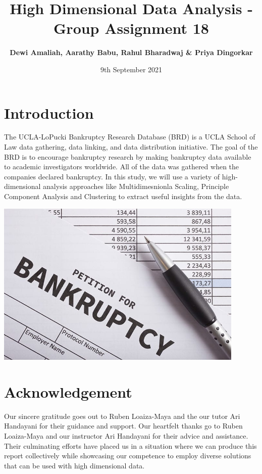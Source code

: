 \documentclass[
]{article}
\title{\textbf{High Dimensional Data Analysis - Group Assignment 18}}
\author{\textbf{Dewi Amaliah, Aarathy Babu, Rahul Bharadwaj \& Priya Dingorkar}}
\date{9th September 2021}
\begin{document}
\maketitle

{
\setcounter{tocdepth}{1}
\tableofcontents
}
\pagebreak

\hypertarget{introduction}{%
\section{Introduction}\label{introduction}}

The UCLA-LoPucki Bankruptcy Research Database (BRD) is a UCLA School of Law data gathering, data linking, and data distribution initiative. The goal of the BRD is to encourage bankruptcy research by making bankruptcy data available to academic investigators worldwide. All of the data was gathered when the companies declared bankruptcy. In this study, we will use a variety of high-dimensional analysis approaches like Multidimesnionla Scaling, Principle Component Analysis and Clustering to extract useful insights from the data.

\begin{center}\includegraphics[width=450px]{data/bank} \end{center}

\pagebreak

\hypertarget{acknowledgement}{%
\section{Acknowledgement}\label{acknowledgement}}

Our sincere gratitude goes out to Ruben Loaiza-Maya and the our tutor Ari Handayani for their guidance and support. Our heartfelt thanks go to Ruben Loaiza-Maya and our instructor Ari Handayani for their advice and assistance. Their culminating efforts have placed us in a situation where we can produce this report collectively while showcasing our competence to employ diverse solutions that can be used with high dimensional data.
\end{document}
